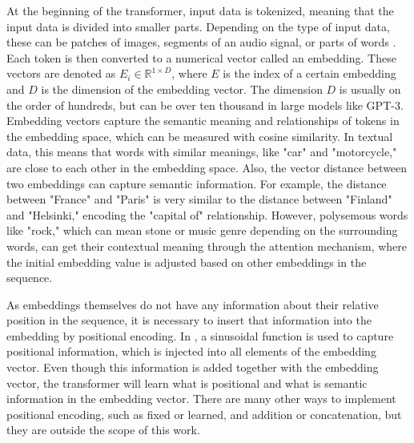 At the beginning of the transformer, input data is tokenized, meaning that the input data is divided into smaller parts. Depending on the type of input data, these can be patches of images, segments of an audio signal, or parts of words \cite{Susnato,Tnbeats}. Each token is then converted to a numerical vector called an embedding. These vectors are denoted as $E_i \in \mathbb{R}^{1 \times D}$, where $E$ is the index of a certain embedding and $D$ is the dimension of the embedding vector. The dimension $D$ is usually on the order of hundreds, but can be over ten thousand in large models like GPT-3.
Embedding vectors capture the semantic meaning and relationships of tokens in the embedding space, which can be measured with cosine similarity. In textual data, this means that words with similar meanings, like "car" and "motorcycle," are close to each other in the embedding space. Also, the vector distance between two embeddings can capture semantic information. For example, the distance between "France" and "Paris" is very similar to the distance between "Finland" and "Helsinki," encoding the "capital of" relationship. \cite{arsenievkoehler2021theoreticalfoundationslimitsword} However, polysemous words like "rock," which can mean stone or music genre depending on the surrounding words, can get their contextual meaning through the attention mechanism, where the initial embedding value is adjusted based on other embeddings in the sequence.

As embeddings themselves do not have any information about their relative position in the sequence, it is necessary to insert that information into the embedding by positional encoding. In \cite{vaswani2023attentionneed}, a sinusoidal function is used to capture positional information, which is injected into all elements of the embedding vector. Even though this information is added together with the embedding vector, the transformer will learn what is positional and what is semantic information in the embedding vector. There are many other ways to implement positional encoding, such as fixed or learned, and addition or concatenation, but they are outside the scope of this work. \cite{posen,kazemnejad2019}

